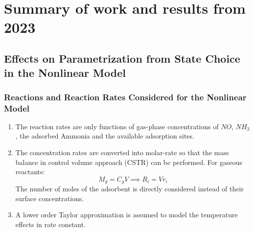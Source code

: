 \section{Summary of work and results from 2023}

\subsection{Effects on Parametrization from State Choice in the Nonlinear Model}

\subsubsection{Reactions and Reaction Rates Considered for the Nonlinear Model}
\begin{enumerate}
\item The reaction rates are only functions of gas-phase concentrations of $NO$,
$NH_3$, the adsorbed Ammonia and the available adsorption sites.

\item The concentration rates are converted into molar-rate so that the
mass balance in control volume approach (CSTR) can be performed. For gaseous reactants:
$$ M_g = C_g V \implies R_i = V r_i $$
The number of moles of the adsorbent is directly considered instead of their
surface concentrations.

\item A lower order Taylor approximation is assumed to model the temperature
effects in rate constant.
\end{enumerate}

